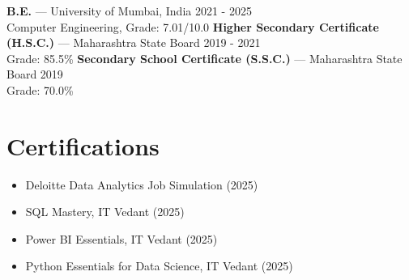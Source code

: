 \documentclass[10pt,a4paper]{article}
\begin{document}
\textbf{B.E.} --- University of Mumbai, India \hfill 2021 - 2025
\\ Computer Engineering, Grade: 7.01/10.0
\vspace{1pt}
\textbf{Higher Secondary Certificate (H.S.C.)} --- Maharashtra State Board \hfill 2019 - 2021
\\ Grade: 85.5\%
\vspace{1pt}
\textbf{Secondary School Certificate (S.S.C.)} --- Maharashtra State Board \hfill 2019
\\ Grade: 70.0\%
\vspace{1pt}

\section*{Certifications}
\begin{itemize}[itemsep=0pt, topsep=1pt]
\item Deloitte Data Analytics Job Simulation (2025)
\item SQL Mastery, IT Vedant (2025)
\item Power BI Essentials, IT Vedant (2025)
\item Python Essentials for Data Science, IT Vedant (2025)
\end{itemize}
\end{document}
